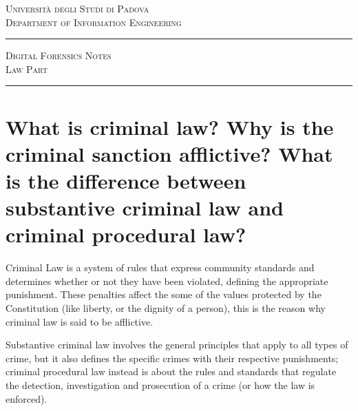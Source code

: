 \documentclass[a4paper, 11pt]{article}
\begin{document}
\vspace*{1cm}

\begin{center}
\large \textsc{Università degli Studi di Padova \\ Department of Information Engineering}

\rule{\linewidth}{1pt} \Huge{ \textsc{Digital Forensics Notes \\ Law Part }} \rule{\linewidth}{2pt}

\end{center}

\section{What is criminal law? Why is the criminal sanction afflictive? What is the difference between substantive criminal law and criminal procedural law?}

Criminal Law is a system of rules that express community standards and determines whether or not they have been violated, defining the appropriate punishment. These penalties affect the some of the values protected by the Constitution (like liberty, or the dignity of a person), this is the reason why criminal law is said to be afflictive.

Substantive criminal law involves the general principles that apply to all types of crime, but it also defines the specific crimes with their respective punishments; criminal procedural law instead is about the rules and standards that regulate the detection, investigation and prosecution of a crime (or how the law is enforced).
\end{document}

